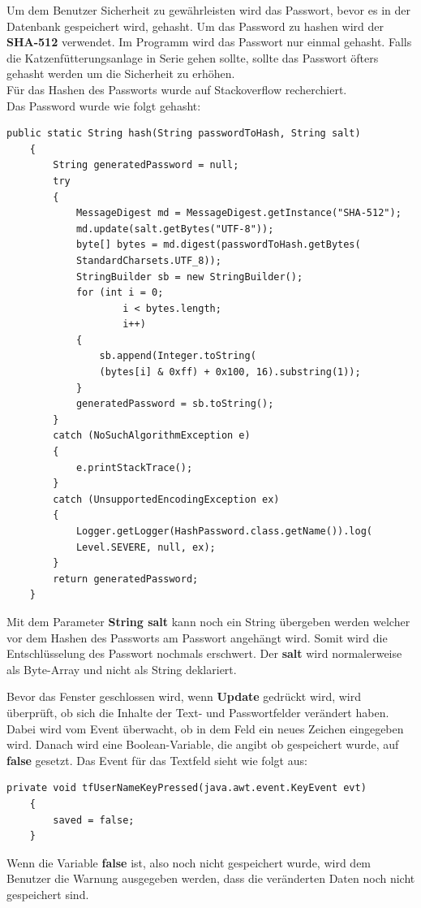 Um dem Benutzer Sicherheit zu gewährleisten wird das Passwort, bevor es in der Datenbank gespeichert wird, gehasht. Um das Password zu hashen wird der \textbf{SHA-512} verwendet. Im Programm wird das Passwort nur einmal gehasht. Falls die Katzenfütterungsanlage in Serie gehen sollte, sollte das Passwort öfters gehasht werden um die Sicherheit zu erhöhen.
\\ Für das Hashen des Passworts wurde auf Stackoverflow  recherchiert.
\\ Das Password wurde wie folgt gehasht:
\begin{lstlisting}[style=Javastyle, caption=Hash Passwort]
    public static String hash(String passwordToHash, String salt)
    {
        String generatedPassword = null;
        try
        {
            MessageDigest md = MessageDigest.getInstance("SHA-512");
            md.update(salt.getBytes("UTF-8"));
            byte[] bytes = md.digest(passwordToHash.getBytes(
            StandardCharsets.UTF_8));
            StringBuilder sb = new StringBuilder();
            for (int i = 0;
                    i < bytes.length;
                    i++)
            {
                sb.append(Integer.toString(
                (bytes[i] & 0xff) + 0x100, 16).substring(1));
            }
            generatedPassword = sb.toString();
        }
        catch (NoSuchAlgorithmException e)
        {
            e.printStackTrace();
        }
        catch (UnsupportedEncodingException ex)
        {
            Logger.getLogger(HashPassword.class.getName()).log(
            Level.SEVERE, null, ex);
        }
        return generatedPassword;
    }
\end{lstlisting}
Mit dem Parameter \textbf{String salt} kann noch ein String übergeben werden welcher vor dem Hashen des Passworts am Passwort angehängt wird. Somit wird die Entschlüsselung des Passwort nochmals erschwert. Der  \textbf{salt} wird normalerweise als Byte-Array und nicht als String deklariert.

\vspace{10pt}

Bevor das Fenster geschlossen wird, wenn \textbf{Update} gedrückt wird, wird überprüft, ob sich die Inhalte der Text- und Passwortfelder verändert haben. Dabei wird vom Event überwacht, ob in dem Feld ein neues Zeichen eingegeben wird. Danach wird eine Boolean-Variable, die angibt ob gespeichert wurde, auf \textbf{false} gesetzt. Das Event für das Textfeld sieht wie folgt aus:
\begin{lstlisting}[style=Javastyle, caption=Textfeld Event]
	private void tfUserNameKeyPressed(java.awt.event.KeyEvent evt)                                       
	{                                           
		saved = false;
	}
\end{lstlisting}
Wenn die Variable \textbf{false} ist, also noch nicht gespeichert wurde, wird dem Benutzer die Warnung ausgegeben werden, dass die veränderten Daten noch nicht gespeichert sind.

